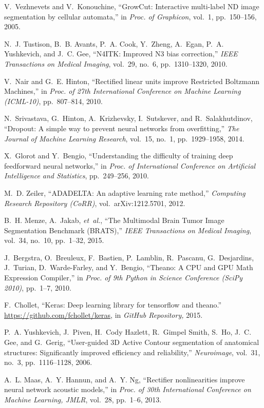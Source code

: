 \documentclass[journal,twocolumn]{IEEEtran}
\begin{document}
\begin{thebibliography}{10}
V.~Vezhnevets and V.~Konouchine, ``{GrowCut: Interactive multi-label ND image
  segmentation by cellular automata},'' in {\em Proc. of Graphicon}, vol.~1,
  pp.~150--156, 2005.

N.~J. Tustison, B.~B. Avants, P.~A. Cook, Y.~Zheng, A.~Egan, P.~A. Yushkevich,
  and J.~C. Gee, ``{N4ITK: Improved N3 bias correction},'' {\em IEEE
  Transactions on Medical Imaging}, vol.~29, no.~6, pp.~1310--1320, 2010.

V.~Nair and G.~E. Hinton, ``{Rectified linear units improve Restricted
  Boltzmann Machines},'' in {\em Proc. of 27th International Conference on
  Machine Learning (ICML-10)}, pp.~807--814, 2010.

N.~Srivastava, G.~Hinton, A.~Krizhevsky, I.~Sutskever, and R.~Salakhutdinov,
  ``{Dropout: A simple way to prevent neural networks from overfitting},'' {\em
  The Journal of Machine Learning Research}, vol.~15, no.~1, pp.~1929--1958,
  2014.

X.~Glorot and Y.~Bengio, ``{Understanding the difficulty of training deep
  feedforward neural networks},'' in {\em Proc. of International Conference on
  Artificial Intelligence and Statistics}, pp.~249--256, 2010.

M.~D. Zeiler, ``{ADADELTA: A}n adaptive learning rate method,'' {\em Computing
  Research Repository {(CoRR)}}, vol.~arXiv:1212.5701, 2012.

B.~H. Menze, A.~Jakab, {\em et~al.}, ``{The Multimodal Brain Tumor Image
  Segmentation Benchmark (BRATS)},'' {\em IEEE Transactions on Medical
  Imaging}, vol.~34, no.~10, pp.~1--32, 2015.

J.~Bergstra, O.~Breuleux, F.~Bastien, P.~Lamblin, R.~Pascanu, G.~Desjardins,
  J.~Turian, D.~Warde-Farley, and Y.~Bengio, ``{Theano: A CPU and GPU Math
  Expression Compiler},'' in {\em Proc. of 9th Python in Science Conference
  (SciPy 2010)}, pp.~1--7, 2010.

F.~Chollet, ``Keras: Deep learning library for tensorflow and theano.''
  \url{https://github.com/fchollet/keras}, in \emph{GitHub Repository,} 2015.

P.~A. Yushkevich, J.~Piven, H.~{Cody Hazlett}, R.~{Gimpel Smith}, S.~Ho, J.~C.
  Gee, and G.~Gerig, ``{User-guided 3D Active Contour segmentation} of
  anatomical structures: {S}ignificantly improved efficiency and reliability,''
  {\em Neuroimage}, vol.~31, no.~3, pp.~1116--1128, 2006.

A.~L. Maas, A.~Y. Hannun, and A.~Y. Ng, ``{Rectifier nonlinearities improve
  neural network acoustic models},'' in {\em Proc. of 30th International
  Conference on Machine Learning, JMLR}, vol.~28, pp.~1--6, 2013.

\end{thebibliography}
\end{document}
